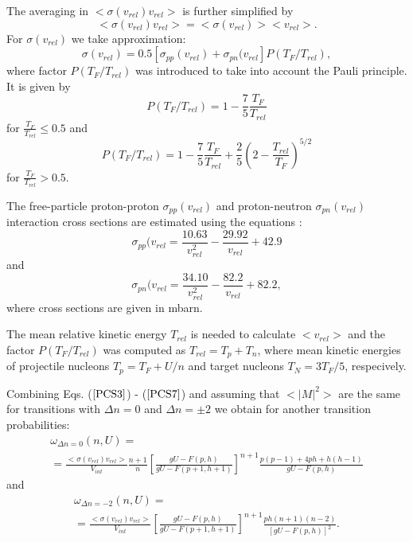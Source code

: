The averaging in $<\sigma(v_{rel})v_{rel}>$ is further simplified by
\begin{equation}
\label{PCS8}<\sigma(v_{rel})v_{rel}> =<\sigma(v_{rel})><v_{rel}>.
\end{equation}
For $\sigma (v_{rel})$ we take approximation:
\begin{equation}
\label{PCS9}\sigma(v_{rel})=0.5[\sigma_{pp}(v_{rel})+\sigma_{pn}(v_{rel}]P(T_F/T_{rel}),
\end{equation}
where factor $P(T_F/T_{rel})$ was introduced to take into account the
Pauli principle. It is given by
\begin{equation}
\label{PCS10} P(T_F/T_{rel})=1 - \frac{7}{5}\frac{T_F}{T_{rel}} 
\end{equation}
for $\frac{T_F}{T_{rel}} \leq 0.5$ and 
\begin{equation}
\label{PCS11} P(T_F/T_{rel})=1 - \frac{7}{5}\frac{T_F}{T_{rel}}+ \frac{2}{5}(2 -
\frac{T_{rel}}{T_F})^{5/2} 
\end{equation}
for $\frac{T_F}{T_{rel}} > 0.5$. 

The free-particle proton-proton $\sigma_{pp}(v_{rel})$ and
proton-neutron $\sigma_{pn}(v_{rel})$ interaction cross sections are
estimated using the equations \cite{Metro58}:
\begin{equation}
\label{PCS12}\sigma_{pp}(v_{rel} =
 \frac{10.63}{v^2_{rel}}-\frac{29.92}{v_{rel}}+42.9
\end{equation}
and
\begin{equation}
\label{PCS13}\sigma_{pn}(v_{rel} =
 \frac{34.10}{v^2_{rel}}-\frac{82.2}{v_{rel}}+82.2,
\end{equation}
where cross sections are given in mbarn.
 
The mean relative kinetic energy $T_{rel}$ is needed to calculate
$<v_{rel}>$ and the factor $P(T_F/T_{rel})$ was computed as
$T_{rel}=T_{p}+T_{n}$, where mean kinetic energies of projectile
nucleons $T_p = T_F +U/n$ and target nucleons $T_N = 3T_F/5$,
respecively.
 

Combining Eqs. ($\ref{PCS3}$) - ($\ref{PCS7}$) and assuming that
$<|M|^{2}>$ are the same for transitions with $\Delta n = 0$ and $\Delta
n = \pm 2$ we obtain for another transition probabilities:
\begin{equation}
\begin{array}{c}
\label{PCS14}\omega_{\Delta n =0}(n,U)= \\
=\frac{<\sigma(v_{rel})v_{rel}>}{V_{int}}
\frac{n+1}{n}[\frac{gU - F(p,h)}{gU - F(p+1,h+1)}]^{n+1}
\frac{p(p-1) + 4ph +h(h-1)}{gU - F(p,h)}
\end{array} 
\end{equation}
and 
\begin{equation}
\begin{array}{c}
\label{PCS15}\omega_{\Delta n 
= -2}(n,U)= \\
=\frac{<\sigma(v_{rel})v_{rel}>}{V_{int}}
 [\frac{gU - F(p,h)}{gU - F(p+1,h+1)}]^{n+1}
 \frac{ph(n+1)(n-2)}{[gU - F(p,h)]^2}.
\end{array} 
\end{equation}

